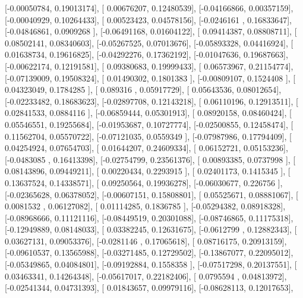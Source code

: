\documentclass{article}
\begin{document}
       [-0.00050784,  0.19013174],
       [ 0.00676207,  0.12480539],
       [-0.04166866,  0.00357159],
       [-0.00040929,  0.10264433],
       [ 0.00523423,  0.04578156],
       [-0.0246161 ,  0.16833647],
       [-0.04846861,  0.0909268 ],
       [-0.06491168,  0.01604122],
       [ 0.09414387,  0.08808711],
       [ 0.08502141,  0.08340603],
       [-0.05267525,  0.07013676],
       [-0.05893328,  0.04416924],
       [ 0.01638734,  0.19616825],
       [-0.04292276,  0.17362192],
       [-0.01047636,  0.19687663],
       [-0.00622174,  0.12191581],
       [ 0.09380683,  0.19999433],
       [ 0.06573967,  0.21154774],
       [-0.07139009,  0.19508324],
       [ 0.01490302,  0.1801383 ],
       [-0.00809107,  0.1524408 ],
       [ 0.04323049,  0.1784285 ],
       [ 0.089316  ,  0.05917729],
       [ 0.05643536,  0.08012654],
       [-0.02233482,  0.18683623],
       [-0.02897708,  0.12143218],
       [ 0.06110196,  0.12913511],
       [ 0.02841533,  0.0884116 ],
       [-0.06859444,  0.05301913],
       [ 0.08920158,  0.08460424],
       [ 0.05546551,  0.19255684],
       [-0.01953687,  0.10727774],
       [-0.02500855,  0.12458474],
       [ 0.11562704,  0.05570722],
       [-0.07121035,  0.0559349 ],
       [-0.07987986,  0.17794409],
       [ 0.04254924,  0.07654703],
       [ 0.01644207,  0.24609334],
       [ 0.06152721,  0.05153236],
       [-0.0483085 ,  0.16413398],
       [-0.02754799,  0.23561376],
       [ 0.00893385,  0.0737998 ],
       [ 0.08143896,  0.09449211],
       [ 0.00220434,  0.2293915 ],
       [ 0.02401173,  0.1415345 ],
       [ 0.13637524,  0.14338571],
       [ 0.09250564,  0.19936278],
       [-0.06030677,  0.226756  ],
       [-0.02365628,  0.06378052],
       [-0.00607151,  0.15808801],
       [ 0.05525671,  0.08881067],
       [ 0.0081532 ,  0.06127082],
       [ 0.01114285,  0.1836785 ],
       [-0.05294382,  0.08918328],
       [-0.08968666,  0.11121116],
       [-0.08449519,  0.20301088],
       [-0.08746865,  0.11175318],
       [-0.12949889,  0.08148033],
       [ 0.03382245,  0.12631675],
       [-0.0612799 ,  0.12882343],
       [ 0.03627131,  0.09053376],
       [-0.0281146 ,  0.17065618],
       [ 0.08716175,  0.20913159],
       [-0.09610537,  0.13565988],
       [-0.03271485,  0.12729502],
       [-0.13867077,  0.22095012],
       [-0.05349865,  0.04084801],
       [-0.09192884,  0.1558358 ],
       [-0.07517298,  0.20137551],
       [ 0.03463341,  0.14264348],
       [-0.05617017,  0.22182406],
       [ 0.0795594 ,  0.04813972],
       [-0.02541344,  0.04731393],
       [ 0.01843657,  0.09979116],
       [-0.08628113,  0.12017653],
\end{document}
